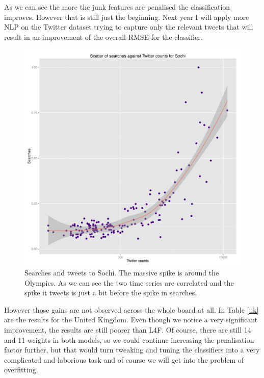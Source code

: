 \documentclass[minf,frontabs,twoside,singlespacing,parskip]{infthesis}
\begin{document}
As we can see the more the junk features are penalised the classification improves. However that is still just the beginning. Next year I will apply more NLP on the Twitter dataset trying to capture only the relevant tweets that will result in an improvement of the overall RMSE for the classifier. 


\begin{figure}[]
\begin{center}
\includegraphics[scale=0.4]{Sochi}
\end{center}
\caption{Searches and tweets to Sochi. The massive spike is around the Olympics. As we can see the two time series are correlated and the spike it tweets is just a bit before the spike in searches.}
\end{figure}


However those gains are not observed across the whole board at all. In Table \ref{uk} are the results for the United Kingdom. Even though we notice a  very significant improvement, the results are still poorer than L4F. Of course, there are still 14 and 11 weights in both models, so we could continue increasing the penalisation factor further, but that would turn tweaking and tuning the classifiers into a very complicated and laborious task and of course we will get into the problem of overfitting.
\end{document}
